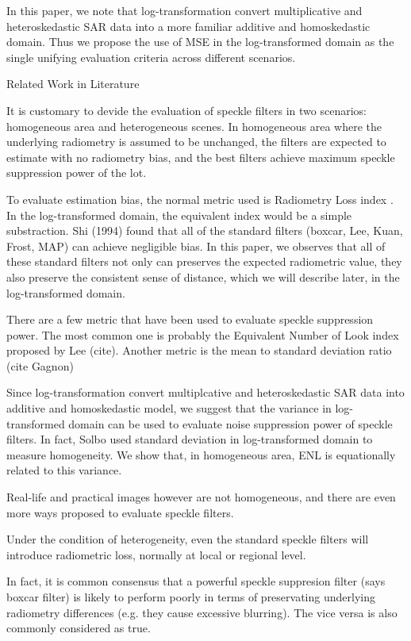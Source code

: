 In this paper, we note that log-transformation convert multiplicative and heteroskedastic SAR data into a more familiar additive and homoskedastic domain.
Thus we propose the use of MSE in the log-transformed domain as the single unifying evaluation criteria across different scenarios.

Related Work in Literature

It is customary to devide the evaluation of speckle filters in two scenarios: homogeneous area and heterogeneous scenes.
In homogeneous area where the underlying radiometry is assumed to be unchanged, the filters are expected to estimate with no radiometry bias, and the best filters achieve maximum speckle suppression power of the lot. 

To evaluate estimation bias, the normal metric used is Radiometry Loss index . 
In the log-transformed domain, the equivalent index would be a simple substraction.
Shi (1994) found that all of the standard filters (boxcar, Lee, Kuan, Frost, MAP) can achieve negligible bias.
In this paper, we observes that all of these standard filters not only can preserves the expected radiometric value, 
  they also preserve the consistent sense of distance, which we will describe later, in the log-transformed domain.

There are a few metric that have been used to evaluate speckle suppression power.
The most common one is probably the Equivalent Number of Look index  proposed by Lee (cite).
Another metric is the mean to standard deviation ratio  (cite Gagnon)

Since log-transformation convert multiplcative and heteroskedastic SAR data into additive and homoskedastic model, we suggest that the variance in log-transformed domain can be used to evaluate noise suppression power of speckle filters.
In fact, Solbo used standard deviation in log-transformed domain to measure homogeneity.
We show that, in homogeneous area, ENL is equationally related to this variance.

Real-life and practical images however are not homogeneous, 
  and there are even more ways proposed to evaluate speckle filters.

Under the condition of heterogeneity, even the standard speckle filters will introduce radiometric loss, normally at local or regional level.

In fact, it is common consensus that a powerful speckle suppresion filter (says boxcar filter) is likely to perform poorly in terms of preservating underlying radiometry differences (e.g. they cause excessive blurring).
The vice versa is also commonly considered as true.

